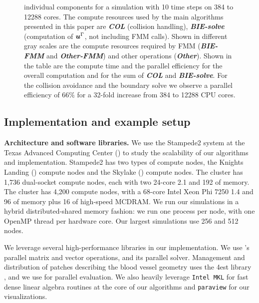 \begin{figure}[!th]
{  individual components for a simulation with 10 time
  steps on 384 to 12288 cores. The compute resources used by the main algorithms presented in this
  paper are {\bf\em COL} (collision handling), {\bf\em BIE-solve}
  (computation of ${\bm{u}}^{\Gamma}$, not including FMM calls). Shown in different gray scales are the
  compute resources required by FMM ({\bf\em BIE-FMM} and {\bf\em
    Other-FMM}) and other operations ({\bf\em Other}). Shown in the table
  are the compute time and the parallel efficiency for the
  overall computation and for the sum of {\bf\em COL} and {\bf\em
    BIE-solve}. For the collision avoidance and the
  boundary solve we observe a parallel efficiency of $66$\% for a
  32-fold increase from 384 to 12288 CPU cores.
}
\end{figure}
\subsection{Implementation and example setup}\label{ss:implementation}

\textbf{Architecture and software libraries. } We use the Stampede2 system at the Texas Advanced Computing Center ()
to study the scalability of our algorithms and implementation.
Stampede2 has two types of compute nodes, the Knights Landing () compute nodes
and the Skylake () compute nodes.
The  cluster has 1,736 dual-socket compute nodes, each with two
24-core 2.1  and 192 of memory.
The  cluster has 4,200 compute nodes, with a 68-core Intel Xeon Phi
7250 1.4  and 96 of memory plus 16 of
high-speed MCDRAM.
We run our simulations in a hybrid distributed-shared memory fashion: we run one
 process per node, with one OpenMP thread per hardware core.
Our largest simulations use 256  and 512  nodes.

We leverage several high-performance libraries in our implementation.
We use 's \cite{balay2017petsc} parallel matrix and vector operations, and its
parallel \gmres solver. 
Management and distribution of patches describing the blood vessel
geometry uses the \p4est library \cite{BursteddeWilcoxGhattas11}, and
we use \pvfmm
\cite{malhotra2015} for parallel \fmm evaluation.
We also heavily leverage \texttt{Intel MKL} for fast dense linear algebra
routines at the core of our algorithms and \texttt{paraview} for our
visualizations.

